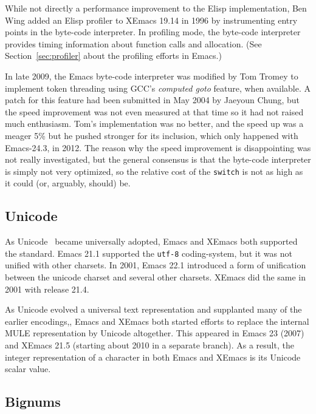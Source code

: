 \documentclass[format=acmsmall, review=false, screen=true]{acmart}
\newcommand \Elisp {Elisp}
\begin{document}
While not directly a performance improvement to the \Elisp{}
implementation, Ben Wing added an \Elisp{} profiler to XEmacs 19.14 in
1996 by instrumenting entry points in the byte-code interpreter.
In profiling mode, the byte-code interpreter provides timing
information about function calls and allocation.  (See
Section~\ref{sec:profiler} about the profiling efforts in Emacs.)

In late 2009, the Emacs byte-code interpreter was modified by Tom Tromey to
implement token threading using GCC's \emph{computed goto} feature, when
available.  A patch for this feature had been submitted in May 2004 by
Jaeyoun Chung, but the speed improvement was not even measured at that time
so it had not raised much enthusiasm.  Tom's implementation was no better,
and the speed up was a meager 5\% but he pushed stronger for its inclusion,
which only happened with Emacs-24.3, in 2012.  The reason why the speed
improvement is disappointing was not really investigated, but the general
consensus is that the byte-code interpreter is simply not very optimized, so
the relative cost of the \texttt{switch} is not as high as it could (or,
arguably, should) be.

\subsection{Unicode}

As Unicode~\cite{Unicode6} became universally adopted, Emacs and
XEmacs both supported the standard.  Emacs 21.1 supported the
\texttt{utf-8} coding-system, but it was not unified with other
charsets.  In 2001, Emacs 22.1 introduced a form of unification
between the unicode charset and several other charsets.  XEmacs did
the same in 2001 with release 21.4.

As Unicode evolved a universal text representation and supplanted many
of the earlier encodings,, Emacs and XEmacs both started efforts to
replace the internal MULE representation by Unicode altogether.  This
appeared in Emacs 23 (2007) and XEmacs 21.5 (starting about 2010 in a
separate branch).  As a result, the integer representation of a
character in both Emacs and XEmacs is its Unicode scalar value.

\subsection{Bignums}
\end{document}

